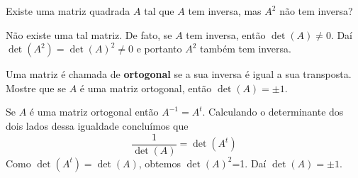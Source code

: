 \begin{problem}
Existe uma matriz quadrada $A$ tal que $A$ tem inversa, mas $A^2$ não tem inversa?
\end{problem}
\begin{solution}
Não existe uma tal matriz. De fato, se $A$ tem inversa, então $\det(A)\neq 0$.
Daí $\det(A^2) = \det(A)^2 \neq 0$ e portanto $A^2$ também tem inversa.
\end{solution}

\begin{problem}
Uma matriz é chamada de {\bf ortogonal} se a sua inversa é igual a sua transposta. 
Mostre que se $A$ é uma matriz ortogonal, então $\det(A) = \pm 1$.
\end{problem}
\begin{solution}
Se $A$ é uma matriz ortogonal então $A^{-1} = A^t$.
Calculando o determinante dos dois lados dessa igualdade concluímos que 
$$\dfrac{1}{\det(A)} = \det(A^t)$$
Como $\det(A^t)=\det(A)$, obtemos $\det(A)^2$=1. Daí $\det(A) = \pm 1$.
\end{solution}
